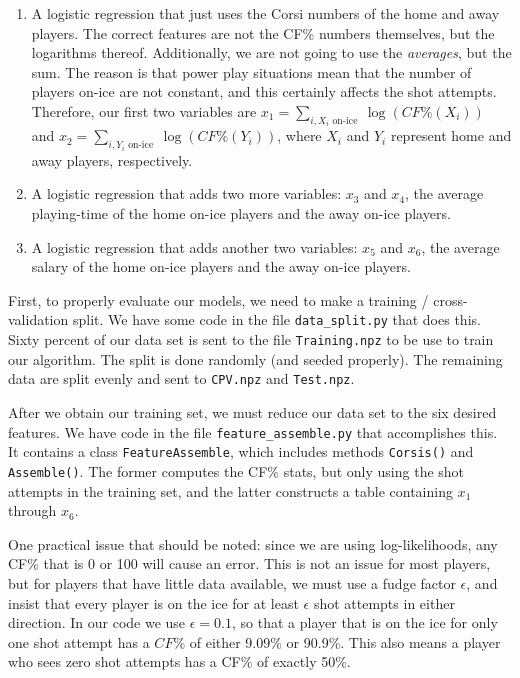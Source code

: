 \documentclass[11pt]{article}
\begin{document}
\begin{enumerate}
\def\labelenumi{\arabic{enumi}.}
\item
  A logistic regression that just uses the Corsi numbers of the home and
  away players. The correct features are not the CF\% numbers
  themselves, but the logarithms thereof. Additionally, we are not going
  to use the \emph{averages}, but the sum. The reason is that power play
  situations mean that the number of players on-ice are not constant,
  and this certainly affects the shot attempts. Therefore, our first two
  variables are
  \(x_1 = \sum_{i, X_i \textrm{ on-ice }} \log(CF\%(X_i))\) and
  \(x_2 = \sum_{i, Y_i \textrm{ on-ice }} \log(CF\%(Y_i))\), where
  \(X_i\) and \(Y_i\) represent home and away players, respectively.
\item
  A logistic regression that adds two more variables: \(x_3\) and
  \(x_4\), the average playing-time of the home on-ice players and the
  away on-ice players.
\item
  A logistic regression that adds another two variables: \(x_5\) and
  \(x_6\), the average salary of the home on-ice players and the away
  on-ice players.
\end{enumerate}

First, to properly evaluate our models, we need to make a training /
cross-validation split. We have some code in the file
\texttt{data\_split.py} that does this. Sixty percent of our data set is
sent to the file \texttt{Training.npz} to be use to train our algorithm.
The split is done randomly (and seeded properly). The remaining data are
split evenly and sent to \texttt{CPV.npz} and \texttt{Test.npz}.

After we obtain our training set, we must reduce our data set to the six
desired features. We have code in the file \texttt{feature\_assemble.py}
that accomplishes this. It contains a class \texttt{FeatureAssemble},
which includes methods \texttt{Corsis()} and \texttt{Assemble()}. The
former computes the CF\% stats, but only using the shot attempts in the
training set, and the latter constructs a table containing \(x_1\)
through \(x_6\).

One practical issue that should be noted: since we are using
log-likelihoods, any CF\% that is 0 or 100 will cause an error. This is
not an issue for most players, but for players that have little data
available, we must use a fudge factor \(\epsilon\), and insist that
every player is on the ice for at least \(\epsilon\) shot attempts in
either direction. In our code we use \(\epsilon=0.1\), so that a player
that is on the ice for only one shot attempt has a \(CF\%\) of either
9.09\% or 90.9\%. This also means a player who sees zero shot attempts
has a CF\% of exactly 50\%.
\end{document}
